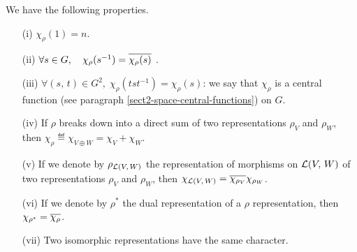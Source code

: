 \begin{prop}
\label{prop-ptes-caracteres}
We have the following properties. \begin{itemize}
\item [{\upshape (i)}] $ \chi_{\rho} (1) = n $.
\item [{\upshape (ii)}] $ \forall s \in G, \quad \chi_{\rho} (s^{-1}) = \overline{\chi_{\rho} (s)} $ .
\item [{\upshape (iii)}] $ \forall (s, \, t) \in G^2, \; \chi_{\rho} (tst^{-1}) = \chi_{\rho} (s) $: we say that $ \chi_{\rho} $ is a central function (see paragraph \ref{sect2-space-central-functions}) on $G$.  
\item [{\upshape (iv)}] If $ \rho $ breaks down into a direct sum of two representations $ \rho_V $ and $ \rho_W $, then $ \chi_{\rho} \eqdef \chi_{V \oplus W} = \chi_{V} + \chi_{W} $.
\item [{\upshape (v)}] If we denote by $ \rho_{\mathcal{L} (V, \, W)} $ the representation of morphisms on $ \mathcal{L} (V, \, W) $ of two representations $ \rho_V $ and $ \rho_W $, then $ \chi_{\mathcal{L} (V, \, W)} = \overline{\chi_{\rho_V}} \chi_{\rho_W} $.
\item [{\upshape (vi)}]  If we denote by $ \rho^* $ the dual representation of a $ \rho $ representation, then $ \chi_{\rho^*} = \overline{\chi_{\rho}} $.
\item [{\upshape (vii)}] Two isomorphic representations have the same character.
\end{itemize}
\end{prop}
